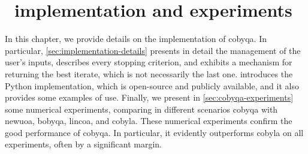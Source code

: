 %
%
%
\chapter{ \textemdash\ implementation and experiments}
\label{ch:cobyqa-implementation}

In this chapter, we provide details on the implementation of \gls{cobyqa}.
In particular, \cref{sec:implementation-details} presents in detail the management of the user's inputs, describes every stopping criterion, and exhibits a mechanism for returning the best iterate, which is not necessarily the last one.
 introduces the Python implementation, which is open-source and publicly available, and it also provides some examples of use.
Finally, we present in \cref{sec:cobyqa-experiments} some numerical experiments, comparing in different scenarios \gls{cobyqa} with \gls{newuoa}, \gls{bobyqa}, \gls{lincoa}, and \gls{cobyla}.
These numerical experiments confirm the good performance of \gls{cobyqa}.
In particular, it evidently outperforms \gls{cobyla} on all experiments, often by a significant margin.


